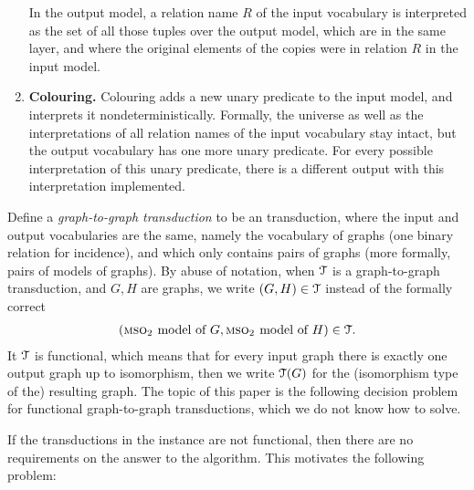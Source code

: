 \begin{definition}
\begin{enumerate}
	In the output model, a relation name $R$ of the input vocabulary is interpreted as the set of all those tuples over the output model, which are in the same layer, and  where the original elements of the copies were in relation $R$
	in the input model.
	\item {\bf Colouring.} \label{mso-trans:colouring} Colouring adds  a new unary predicate to the input model, and interprets it nondeterministically. Formally, the universe as well as the interpretations of all relation names of the input vocabulary stay intact,
	but the output vocabulary has one more unary predicate. For every possible interpretation of this unary predicate, there is a different output with this interpretation implemented.
\end{enumerate}
\end{definition}

  Define a \emph{graph-to-graph \mso transduction} to be an \mso transduction, where the input and output vocabularies are the same, namely the vocabulary of graphs (one binary relation for incidence), and which only contains pairs of graphs (more formally, pairs of \msotwo models of graphs).  By abuse of notation, when ${\mathcal T}$ is a graph-to-graph \mso transduction, and $G,H$ are graphs, we write $(G,H) \in {\mathcal T}$ instead of the formally correct 
\begin{align*}
(\text{{\sc mso$_2$ }model of $G$}, \text{{\sc mso$_2$ }model of $H$})\in {\mathcal T}.
\end{align*}
It ${\mathcal T}$ is functional, which means that for every input graph there is exactly one output graph up to isomorphism, then we write ${\mathcal T}(G)$ for the (isomorphism type of the) resulting graph. 
The topic of this paper is   the following  decision problem for functional \mso graph-to-graph transductions, which  we do not know how to solve.



If the  transductions in the instance are not functional, then there are no requirements on the answer to the algorithm. This motivates the following problem:

    


